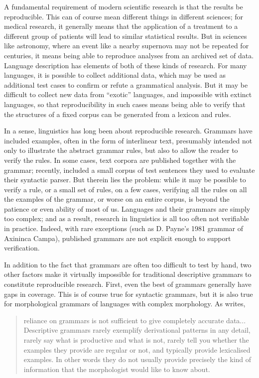 A fundamental requirement of modern scientific research is that the results be reproducible. This can of course mean different things in different sciences; for medical research, it generally means that the application of a treatment to a different group of patients will lead to similar statistical results. But in sciences like astronomy, where an event like a nearby supernova may not be repeated for centuries, it means being able to reproduce analyses from an archived set of data. Language description has elements of both of these kinds of research. For many languages, it is possible to collect additional data, which may be used as additional test cases to confirm or refute a grammatical analysis. But it may be difficult to collect new data from ``exotic'' languages, and impossible with extinct languages, so that reproducibility in such cases means being able to verify that the structures of a fixed corpus can be generated from a lexicon and rules. 

In a sense, linguistics has long been about reproducible research. Grammars have included examples, often in the form of interlinear text, presumably intended not only to illustrate the abstract grammar rules, but also to allow the reader to verify the rules. In some cases, text corpora are published together with the grammar; recently, \citet{BahraniEtAl2011} included a small corpus of test sentences they used to evaluate their syntactic parser. But therein lies the problem: while it may be possible to verify a rule, or a small set of rules, on a few cases, verifying all the rules on all the examples of the grammar, or worse on an entire corpus, is beyond the patience or even ability of most of us. Languages and their grammars are simply too complex; and as a result, research in linguistics is all too often not verifiable in practice. Indeed, with rare exceptions (such as D. Payne's 1981 grammar of Axininca Campa), published grammars are not explicit enough to support verification. \nocite{Payne1981}

In addition to the fact that grammars are often too difficult to test by hand, two other factors make it virtually impossible for traditional descriptive grammars to constitute reproducible research. First, even the best of grammars generally have gaps in coverage. This is of course true for syntactic grammars, but it is also true for morphological grammars of languages with complex morphology. As \citet{Bauer2010} writes, 
\begin{quote}
 reliance on grammars is not sufficient to give completely accurate data... Descriptive grammars rarely exemplify derivational patterns in any detail, rarely say what is productive and what is not, rarely tell you whether the examples they provide are regular or not, and typically provide lexicalised examples. In other words they do not usually provide precisely the kind of information that the morphologist would like to know about.
\end{quote}

